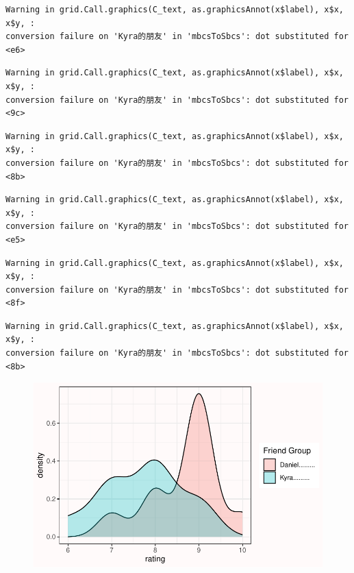 \documentclass[
  letterpaper,
  DIV=11,
  numbers=noendperiod]{scrreprt}
\begin{document}
\begin{verbatim}
Warning in grid.Call.graphics(C_text, as.graphicsAnnot(x$label), x$x, x$y, :
conversion failure on 'Kyra的朋友' in 'mbcsToSbcs': dot substituted for <e6>
\end{verbatim}

\begin{verbatim}
Warning in grid.Call.graphics(C_text, as.graphicsAnnot(x$label), x$x, x$y, :
conversion failure on 'Kyra的朋友' in 'mbcsToSbcs': dot substituted for <9c>
\end{verbatim}

\begin{verbatim}
Warning in grid.Call.graphics(C_text, as.graphicsAnnot(x$label), x$x, x$y, :
conversion failure on 'Kyra的朋友' in 'mbcsToSbcs': dot substituted for <8b>
\end{verbatim}

\begin{verbatim}
Warning in grid.Call.graphics(C_text, as.graphicsAnnot(x$label), x$x, x$y, :
conversion failure on 'Kyra的朋友' in 'mbcsToSbcs': dot substituted for <e5>
\end{verbatim}

\begin{verbatim}
Warning in grid.Call.graphics(C_text, as.graphicsAnnot(x$label), x$x, x$y, :
conversion failure on 'Kyra的朋友' in 'mbcsToSbcs': dot substituted for <8f>
\end{verbatim}

\begin{verbatim}
Warning in grid.Call.graphics(C_text, as.graphicsAnnot(x$label), x$x, x$y, :
conversion failure on 'Kyra的朋友' in 'mbcsToSbcs': dot substituted for <8b>
\end{verbatim}

\begin{figure}

{\centering \includegraphics[width=1\textwidth,height=\textheight]{01-pvalue_files/figure-pdf/unnamed-chunk-3-1.pdf}

}

\end{figure}
\end{document}
